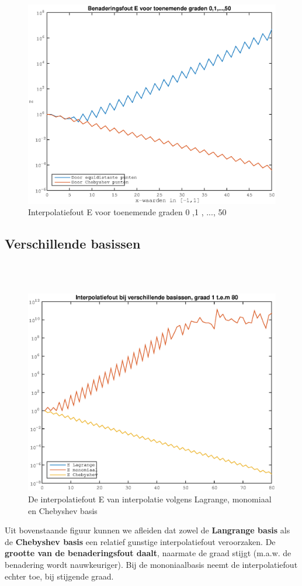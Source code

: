 \documentclass{article}
\begin{document}
\begin{figure}[H]
\includegraphics[width=0.60\columnwidth]{benaderingsfout_interpolatiepunten}
\caption{Interpolatiefout E voor toenemende graden 0 ,1 , ..., 50} %
\end{figure}



\subsection{Verschillende basissen}
\\ \ \\


\begin{figure}[H]
\includegraphics[width=0.60\columnwidth]{verschillende_basissen}
\caption{De interpolatiefout E van interpolatie volgens Lagrange, monomiaal en Chebyshev basis} %
\end{figure}


Uit bovenstaande figuur kunnen we afleiden dat zowel de \textbf{Langrange basis} als de \textbf{Chebyshev basis} een relatief gunstige interpolatiefout veroorzaken. De \textbf{grootte van de benaderingsfout daalt}, naarmate de graad stijgt (m.a.w. de benadering wordt nauwkeuriger). Bij de mononiaalbasis neemt de interpolatiefout echter toe, bij stijgende graad. \\ \\
\end{document}
